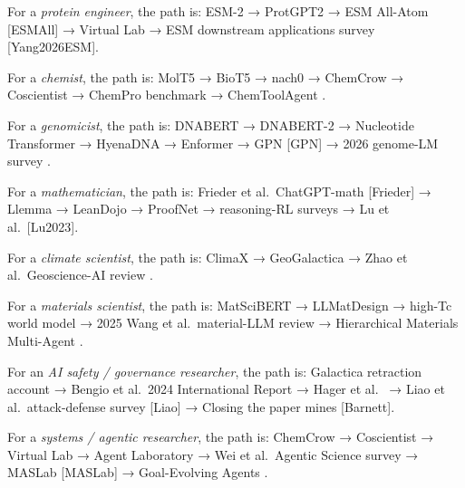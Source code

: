 \documentclass{article}
\begin{document}
For a \emph{protein engineer}, the path is: ESM-2 \cite{lin2022evolutionaryscalep} → ProtGPT2 \cite{ferruz2022naturecommunicatio} → ESM All-Atom {[}ESMAll{]} → Virtual Lab \cite{swanson2024thevirtuallabaiage} → ESM downstream applications survey {[}Yang2026ESM{]}.

For a \emph{chemist}, the path is: MolT5 \cite{edwards2022emnlp2022} → BioT5 \cite{pei2023emnlp2023} → nach0 \cite{livne2024nach0multimodalnat} → ChemCrow \cite{bran2024naturemachineintel} → Coscientist \cite{boiko2023nature6242023} → ChemPro benchmark \cite{baranwal2026arxiv2602031082026} → ChemToolAgent \cite{yu2024chemtoolagenttheim}.

For a \emph{genomicist}, the path is: DNABERT \cite{ji2020biorxiv2020} → DNABERT-2 \cite{zhou2023arxiv2306150062023} → Nucleotide Transformer \cite{dallatorre2024nucleotidetransfor} → HyenaDNA \cite{nguyen2023hyenadnalongrangeg} → Enformer \cite{avsec2021effectivegeneexpre} → GPN {[}GPN{]} → 2026 genome-LM survey \cite{shu2026acomprehensivesurv}.

For a \emph{mathematician}, the path is: Frieder et al.~ChatGPT-math {[}Frieder{]} → Llemma \cite{azerbayev2023llemmaanopenlangua} → LeanDojo \cite{yang2023leandojotheorempro} → ProofNet \cite{azerbayev2023arxiv2302124332023} → reasoning-RL surveys \cite{zhao2026appliedandcomputat} → Lu et al.~{[}Lu2023{]}.

For a \emph{climate scientist}, the path is: ClimaX \cite{nguyen2023arxiv2301103432023} → GeoGalactica \cite{lin2023geogalacticaascien} → Zhao et al.~Geoscience-AI review \cite{zhao2024artificialintellig}.

For a \emph{materials scientist}, the path is: MatSciBERT \cite{gupta2022matscibertamateria} → LLMatDesign \cite{jia2024arxiv2406131632024} → high-Tc world model \cite{guo2026expertevaluationof} → 2025 Wang et al.~material-LLM review \cite{wang2025knowledgeguidedlar} → Hierarchical Materials Multi-Agent \cite{rothfarb2025hierarchicalmultia}.

For an \emph{AI safety / governance researcher}, the path is: Galactica retraction account \cite{taylor2022arxiv2211090852022} → Bengio et al.~2024 International Report \cite{bengio2024internationalscien} → Hager et al.~\cite{hager2024evaluationandmitig} → Liao et al.~attack-defense survey {[}Liao{]} → Closing the paper mines {[}Barnett{]}.

For a \emph{systems / agentic researcher}, the path is: ChemCrow \cite{bran2024naturemachineintel} → Coscientist \cite{boiko2023nature6242023} → Virtual Lab \cite{swanson2024thevirtuallabaiage} → Agent Laboratory \cite{schmidgall2025agentlaboratoryusi} → Wei et al.~Agentic Science survey \cite{wei2025fromaiforscienceto} → MASLab {[}MASLab{]} → Goal-Evolving Agents \cite{du2025acceleratingscient}.
\end{document}
